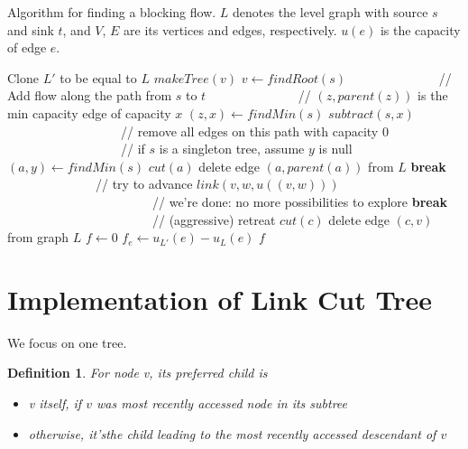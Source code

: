 \documentclass[11pt]{article}
\newtheorem{defn}{Definition}
\begin{document}
\begin{algorithm}[H] 
  \caption{Algorithm for finding a blocking flow. $L$ denotes the level graph with source $s$ and sink $t$, and $V$, $E$ are its vertices and edges, respectively. $u(e)$ is the capacity of edge $e$.} \label{fig:blocking}
  \begin{algorithmic}[1]
    \State Clone $L'$ to be equal to $L$
      \State $makeTree(v)$
    \EndFor
      \State $v\leftarrow findRoot(s)$
        \Statex\ \ \ \ \ \ \ \ \ \ \ \ \ \ // Add flow along the path from $s$ to $t$
        \Statex\ \ \ \ \ \ \ \ \ \ \ \ \ \ // $(z, parent(z))$ is the min capacity edge of capacity $x$
        \State $(z,x)\leftarrow findMin(s)$
        \State $subtract(s, x)$
        \Statex \ \ \ \ \ \ \ \ \ \ \ \ \ \ \ \ \ \ // remove all edges on this path with capacity $0$
        \Statex \ \ \ \ \ \ \ \ \ \ \ \ \ \ \ \ \ \ // if $s$ is a singleton tree, assume $y$ is null
        \State $(a,y)\leftarrow findMin(s)$
          \State $cut(a)$
          \State delete edge $(a, parent(a))$ from $L$
        \Else
          \State \textbf{break}
        \EndIf
        \EndWhile
      \Else
        \Statex\ \ \ \ \ \ \ \ \ \ \ \ \ \ // try to advance
          \State $link(v, w, u((v,w)))$
        \Else
            \Statex \ \ \ \ \ \ \ \ \ \ \ \ \ \ \ \ \ \ \ \ \ \ \ // we're done: no more possibilities to explore
            \State \textbf{break}
          \Else
            \Statex \ \ \ \ \ \ \ \ \ \ \ \ \ \ \ \ \ \ \ \ \ \ \ // (aggressive) retreat
              \State $cut(c)$
              \State delete edge $(c, v)$ from graph $L$
            \EndFor
          \EndIf
        \EndIf
      \EndIf
    \EndWhile
    \State $f\leftarrow 0$
      \State $f_e\leftarrow u_{L'}(e) - u_L(e)$
    \EndFor
    \State \Return $f$ 
    \EndProcedure
  \end{algorithmic}
\end{algorithm}

\section{Implementation of Link Cut Tree}

We focus on one tree.
\begin{defn} 
For node v, its preferred child is 
\begin{itemize}
	\item v itself, if $v$ was most recently accessed node in its subtree
	\item otherwise, it'sthe child leading to the most recently accessed descendant of $v$
\end{itemize}
\end{defn}
\end{document}
